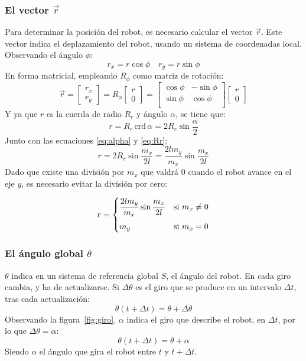 \documentclass[10pt,a4paper,hidelinks,twocolumn]{article}
\begin{document}
\subsubsection{El vector $\vec{r}$}
Para determinar la posición del robot, es necesario calcular el vector 
$\vec{r}$. Este vector indica el deplazamiento del robot, usando un sistema de 
coordenadas local. Observando el ángulo $\phi$:
$$r_x = r \cos \phi \quad
r_y = r \sin \phi $$
En forma matricial, empleando $R_\phi$ como matriz de rotación:
\begin{equation}
\vec{r} =
\begin{bmatrix}
r_x\\
r_y
\end{bmatrix}
=
R_\phi
\begin{bmatrix}
r\\
0
\end{bmatrix}
=
\begin{bmatrix}
\cos \phi & -\sin \phi \\
\sin \phi & \cos \phi \\
\end{bmatrix}
\begin{bmatrix}
r\\
0
\end{bmatrix}
\label{eq:r_matrix}
\end{equation}
Y ya que $r$ es la cuerda de radio $R_r$ y ángulo $\alpha$, se tiene que:
$$ r = R_r \, \text{crd} \, \alpha = 2 R_r \sin \frac{\alpha}{2} $$
Junto con las ecuaciones \ref{eq:alpha} y \ref{eq:Rr}:
$$ r = 2 R_r \sin \frac{m_x}{2l} =
	\frac{2 l m_y}{m_x} \sin \frac{m_x}{2l}$$
Dado que existe una división por $m_x$ que valdrá 0 cuando el robot avance en 
el eje $y$, es necesario evitar la división por cero:

\begin{equation}
r = \begin{dcases}
		\frac{2 l m_y}{m_x} \sin \frac{m_x}{2l} & \text{si } m_x \ne 0 \\[1mm]
		m_y & \text{si } m_x = 0 \\
	\end{dcases}
\label{eq:r}
\end{equation}
\subsubsection{El ángulo global $\theta$}
$\theta$ indica en un sistema de referencia global $S$, el ángulo del robot. En 
cada giro cambia, y ha de actualizarse. Si $\Delta \theta$ es el giro que se 
produce en un intervalo $\Delta t$, tras cada actualización:
	$$ \theta(t + \Delta t) = \theta + \Delta \theta $$
Observando la figura~\ref{fig:giro}, $\alpha$ indica el giro que describe el 
robot, en $\Delta t$, por lo que $\Delta \theta = \alpha$:
\begin{equation}
	\theta(t + \Delta t) = \theta + \alpha
\end{equation}
Siendo $\alpha$ el ángulo que gira el robot entre $t$ y $t + \Delta t$.
\end{document}
